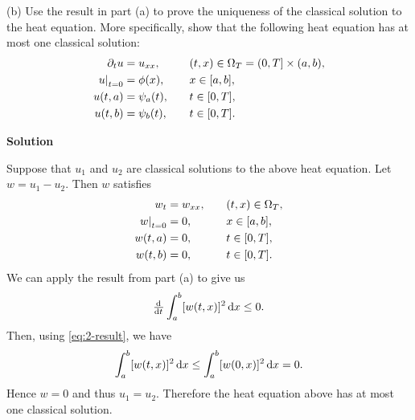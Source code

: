 \documentclass{article}
\begin{document}
\vspace{5mm}

(b) Use the result in part (a) to prove the uniqueness of the classical
solution to the heat equation. More specifically, show that the
following heat equation has at most one classical solution:
%
\begin{alignat*}{2}
    \partial_t u &= u_{x x}, &&\quad (t, x) \in \Omega_T = (0, T] \times (a, b), \\
    \eval[0]{u}_{t = 0} &= \phi(x), &&\quad x \in [a, b], \\
    u(t, a) &= \psi_a(t), &&\quad t \in [0, T], \\
    u(t, b) &= \psi_b(t), &&\quad t \in [0, T].
\end{alignat*}

\textbf{Solution}

Suppose that $u_1$ and $u_2$ are classical solutions to the above heat
equation. Let $w = u_1 - u_2$. Then $w$ satisfies
%
\begin{alignat*}{2}
    w_t &= w_{x x}, &&\quad (t, x) \in \Omega_T, \\
    \eval[0]{w}_{t = 0} &= 0, &&\quad x \in [a, b], \\
    w(t, a) &= 0, &&\quad t \in [0, T], \\
    w(t, b) &= 0, &&\quad t \in [0, T].
\end{alignat*}
%
We can apply the result from part (a) to give us
%
\begin{equation}
    \od{}{t} \int_a^b [w(t, x)]^2 \dif x \leq 0
    \label{eq:2-result}
    .
\end{equation}
%
Then, using \eqref{eq:2-result}, we have
%
\begin{equation*}
    \int_a^b [w(t, x)]^2 \dif x \leq \int_a^b [w(0, x)]^2 \dif x = 0
    .
\end{equation*}
%
Hence $w = 0$ and thus $u_1 = u_2$. Therefore the heat equation above
has at most one classical solution.
\end{document}
